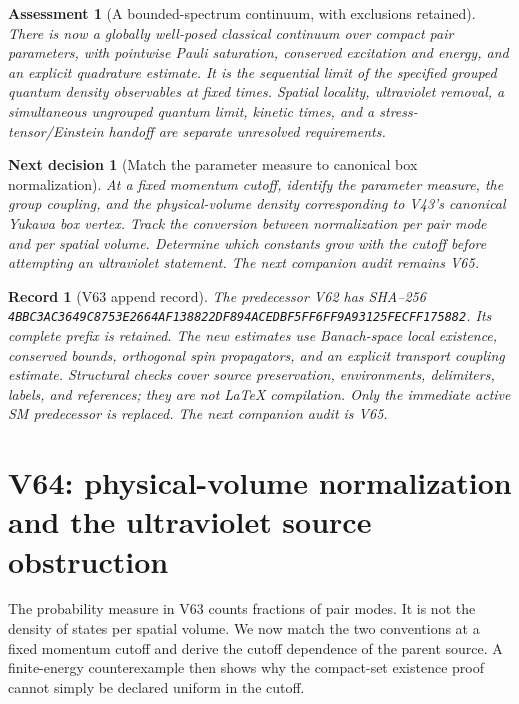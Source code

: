 \documentclass[11pt]{article}
\newtheorem{decision}[theorem]{Next decision}
\newtheorem{assessment}[theorem]{Assessment}
\newtheorem{record}[theorem]{Record}
\theoremstyle{remark}
\begin{document}
\begin{assessment}[A bounded-spectrum continuum, with exclusions retained]
\label{ass:v20v63}
There is now a globally well-posed classical continuum
over compact pair parameters, with pointwise Pauli
saturation, conserved excitation and energy, and an
explicit quadrature estimate.  It is the sequential
limit of the specified grouped quantum density
observables at fixed times.  Spatial locality,
ultraviolet removal, a simultaneous ungrouped quantum
limit, kinetic times, and a stress-tensor/Einstein
handoff are separate unresolved requirements.
\end{assessment}

\begin{decision}[Match the parameter measure to canonical box normalization]
\label{dec:v20v63-next}
At a fixed momentum cutoff, identify the parameter
measure, the group coupling, and the physical-volume
density corresponding to V43's canonical Yukawa box
vertex.  Track the conversion between normalization
per pair mode and per spatial volume.  Determine
which constants grow with the cutoff before attempting
an ultraviolet statement.  The next companion audit
remains V65.
\end{decision}

\begin{record}[V63 append record]
\label{rec:v20v63}
The predecessor V62 has SHA--256
\texttt{4BBC3AC3649C8753E2664AF138822DF894ACEDBF5FF6FF9A93125FECFF175882}.
Its complete prefix is retained.  The new estimates
use Banach-space local existence, conserved bounds,
orthogonal spin propagators, and an explicit transport
coupling estimate.  Structural checks cover source
preservation, environments, delimiters, labels, and
references; they are not LaTeX compilation.
Only the immediate active SM predecessor is replaced.
The next companion audit is V65.
\end{record}


\section{V64: physical-volume normalization and the ultraviolet source obstruction}
\label{sec:v20v64}

The probability measure in V63 counts fractions of pair modes.
It is not the density of states per spatial volume.  We now
match the two conventions at a fixed momentum cutoff and
derive the cutoff dependence of the parent source.  A
finite-energy counterexample then shows why the compact-set
existence proof cannot simply be declared uniform in the cutoff.
\end{document}
